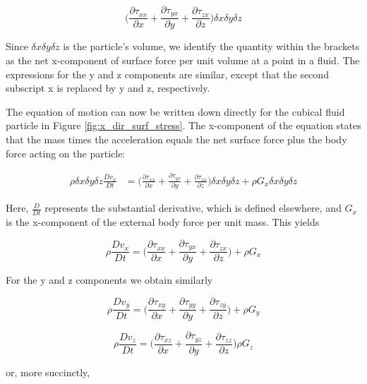 \documentclass{article}
\begin{document}
{$$\bigg(\frac{\partial \tau_{xx}}{\partial x} + \frac{\partial \tau_{yx}}{\partial y} + \frac{\partial \tau_{zx}}{\partial z}\bigg)\delta x\delta y\delta z$$

Since $\delta x \delta y \delta z$ is the particle's volume, we identify the quantity within the brackets as the
net x-component of surface force per unit volume at a point in a fluid. The expressions for
the y and z components are similar, except that the second subscript x is replaced by y and z,
respectively.

The equation of motion can now be written down directly for the cubical fluid particle in Figure \ref{fig:x_dir_surf_stress}. The x-component of the equation states that the mass times the acceleration equals the net surface force plus the body force acting on the particle:

\begin{align*}
\rho \delta x\delta y\delta z \frac{Dv_{x}}{Dt} &= \bigg(\frac{\partial \tau_{xx}}{\partial x} + \frac{\partial \tau_{yx}}{\partial y} + \frac{\partial \tau_{zx}}{\partial z}\bigg)\delta x\delta y\delta z + \rho G_{x}\delta x\delta y\delta z
\end{align*}

Here, $\frac{D}{Dt}$ represents the substantial derivative, which is defined elsewhere, and $G_x$ is the x-component of the external body force per unit mass. This yields

\begin{equation}\label{e15a} 
\rho \frac{Dv_{x}}{Dt} = \bigg(\frac{\partial \tau_{xx}}{\partial x} + \frac{\partial \tau_{yx}}{\partial y} + \frac{\partial \tau_{zx}}{\partial z}\bigg) + \rho G_{x}\tag{15a}
\end{equation}

For the y and z components we obtain similarly

\begin{equation}\label{e15b} 
\rho \frac{Dv_{y}}{Dt} = \bigg(\frac{\partial \tau_{xy}}{\partial x} + \frac{\partial \tau_{yy}}{\partial y} + \frac{\partial \tau_{zy}}{\partial z}\bigg) + \rho G_{y}\tag{15b}
\end{equation}

\begin{equation}\label{e15c} 
\rho \frac{Dv_{z}}{Dt} = \bigg(\frac{\partial \tau_{xz}}{\partial x} + \frac{\partial \tau_{yz}}{\partial y} + \frac{\partial \tau_{zz}}{\partial z}\bigg) \rho G_{z}\tag{15c}
\end{equation}

or, more succinctly,

}
\end{document}
